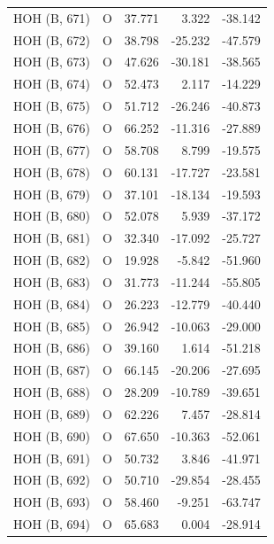 \begin{longtable}{@{}lcrr@{}}
  \cmidrule(r){1-5}
  HOH (B, 671) & O & 37.771 & 3.322 & -38.142 \\
  \cmidrule(r){1-5}
  HOH (B, 672) & O & 38.798 & -25.232 & -47.579 \\
  \cmidrule(r){1-5}
  HOH (B, 673) & O & 47.626 & -30.181 & -38.565 \\
  \cmidrule(r){1-5}
  HOH (B, 674) & O & 52.473 & 2.117 & -14.229 \\
  \cmidrule(r){1-5}
  HOH (B, 675) & O & 51.712 & -26.246 & -40.873 \\
  \cmidrule(r){1-5}
  HOH (B, 676) & O & 66.252 & -11.316 & -27.889 \\
  \cmidrule(r){1-5}
  HOH (B, 677) & O & 58.708 & 8.799 & -19.575 \\
  \cmidrule(r){1-5}
  HOH (B, 678) & O & 60.131 & -17.727 & -23.581 \\
  \cmidrule(r){1-5}
  HOH (B, 679) & O & 37.101 & -18.134 & -19.593 \\
  \cmidrule(r){1-5}
  HOH (B, 680) & O & 52.078 & 5.939 & -37.172 \\
  \cmidrule(r){1-5}
  HOH (B, 681) & O & 32.340 & -17.092 & -25.727 \\
  \cmidrule(r){1-5}
  HOH (B, 682) & O & 19.928 & -5.842 & -51.960 \\
  \cmidrule(r){1-5}
  HOH (B, 683) & O & 31.773 & -11.244 & -55.805 \\
  \cmidrule(r){1-5}
  HOH (B, 684) & O & 26.223 & -12.779 & -40.440 \\
  \cmidrule(r){1-5}
  HOH (B, 685) & O & 26.942 & -10.063 & -29.000 \\
  \cmidrule(r){1-5}
  HOH (B, 686) & O & 39.160 & 1.614 & -51.218 \\
  \cmidrule(r){1-5}
  HOH (B, 687) & O & 66.145 & -20.206 & -27.695 \\
  \cmidrule(r){1-5}
  HOH (B, 688) & O & 28.209 & -10.789 & -39.651 \\
  \cmidrule(r){1-5}
  HOH (B, 689) & O & 62.226 & 7.457 & -28.814 \\
  \cmidrule(r){1-5}
  HOH (B, 690) & O & 67.650 & -10.363 & -52.061 \\
  \cmidrule(r){1-5}
  HOH (B, 691) & O & 50.732 & 3.846 & -41.971 \\
  \cmidrule(r){1-5}
  HOH (B, 692) & O & 50.710 & -29.854 & -28.455 \\
  \cmidrule(r){1-5}
  HOH (B, 693) & O & 58.460 & -9.251 & -63.747 \\
  \cmidrule(r){1-5}
  HOH (B, 694) & O & 65.683 & 0.004 & -28.914 \\

\end{longtable}
